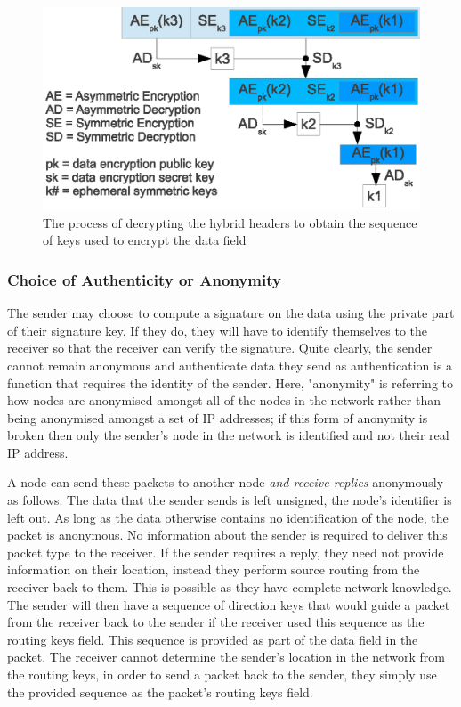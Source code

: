 \documentclass[ %
                    author={Luke Murray},
                supervisor={Dr. Simon Hollis},
                     title={Shadow Peer-to-Peer Networks},
                  subtitle={},
                    degree={MEng},
                      year={2013} ]{thesis}
\begin{document}
\begin{figure}[h]
    \centering
    \includegraphics{diagrams/hybrid_header_decryption.eps}
    \caption{The process of decrypting the hybrid headers to obtain the sequence of keys used to encrypt the data field}
    \label{hybrid_decrypt}
\end{figure}

\subsubsection{Choice of Authenticity or Anonymity}

The sender may choose to compute a signature on the data using the private part of their signature key. If they do, they will have to identify themselves to the receiver so that the receiver can verify the signature. Quite clearly, the sender cannot remain anonymous and authenticate data they send as authentication is a function that requires the identity of the sender. Here, "anonymity" is referring to how nodes are anonymised amongst all of the nodes in the network rather than being anonymised amongst a set of IP addresses; if this form of anonymity is broken then only the sender's node in the network is identified and not their real IP address.

A node can send these packets to another node {\em and receive replies} anonymously as follows. The data that the sender sends is left unsigned, the node's identifier is left out. As long as the data otherwise contains no identification of the node, the packet is anonymous. No information about the sender is required to deliver this packet type to the receiver. If the sender requires a reply, they need not provide information on their location, instead they perform source routing from the receiver back to them. This is possible as they have complete network knowledge. The sender will then have a sequence of direction keys that would guide a packet from the receiver back to the sender if the receiver used this sequence as the routing keys field. This sequence is provided as part of the data field in the packet. The receiver cannot determine the sender's location in the network from the routing keys, in order to send a packet back to the sender, they simply use the provided sequence as the packet's routing keys field.
\end{document}

